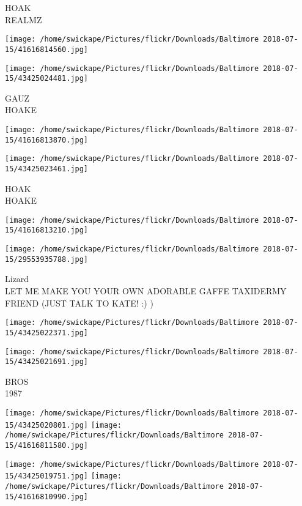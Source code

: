 \documentclass[10pt,letterpaper]{article}
\begin{document}
HOAK\\
REALMZ
\pagebreak

\texttt{[image: /home/swickape/Pictures/flickr/Downloads/Baltimore 2018-07-15/41616814560.jpg]}

\vspace{0.25in}
\texttt{[image: /home/swickape/Pictures/flickr/Downloads/Baltimore 2018-07-15/43425024481.jpg]}

GAUZ\\
HOAKE
\pagebreak

\texttt{[image: /home/swickape/Pictures/flickr/Downloads/Baltimore 2018-07-15/41616813870.jpg]}

\vspace{0.25in}
\texttt{[image: /home/swickape/Pictures/flickr/Downloads/Baltimore 2018-07-15/43425023461.jpg]}

HOAK\\
HOAKE
\pagebreak

\texttt{[image: /home/swickape/Pictures/flickr/Downloads/Baltimore 2018-07-15/41616813210.jpg]}

\vspace{0.25in}
\texttt{[image: /home/swickape/Pictures/flickr/Downloads/Baltimore 2018-07-15/29553935788.jpg]}

Lizard\\
LET ME MAKE YOU YOUR OWN ADORABLE GAFFE TAXIDERMY FRIEND (JUST TALK TO KATE! :) )
\pagebreak

\texttt{[image: /home/swickape/Pictures/flickr/Downloads/Baltimore 2018-07-15/43425022371.jpg]}

\vspace{0.25in}
\texttt{[image: /home/swickape/Pictures/flickr/Downloads/Baltimore 2018-07-15/43425021691.jpg]}

BROS\\
1987
\pagebreak

\texttt{[image: /home/swickape/Pictures/flickr/Downloads/Baltimore 2018-07-15/43425020801.jpg]}
\texttt{[image: /home/swickape/Pictures/flickr/Downloads/Baltimore 2018-07-15/41616811580.jpg]}

\texttt{[image: /home/swickape/Pictures/flickr/Downloads/Baltimore 2018-07-15/43425019751.jpg]}
\texttt{[image: /home/swickape/Pictures/flickr/Downloads/Baltimore 2018-07-15/41616810990.jpg]}
\end{document}
